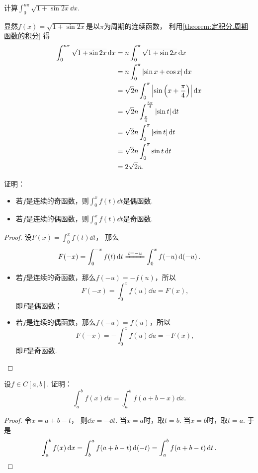 \begin{example}
计算\(\int_0^{n\pi} \sqrt{1 + \sin2x} \dd{x}\).
\begin{solution}
显然\(f(x) = \sqrt{1 + \sin2x}\)是以\(\pi\)为周期的连续函数，
利用\cref{theorem:定积分.周期函数的积分} 得\begin{align*}
	\int_0^{n\pi} \sqrt{1 + \sin2x} \dd{x}
	&= n \int_0^\pi \sqrt{1 + \sin2x} \dd{x} \\
	&= n \int_0^\pi \abs{\sin x + \cos x} \dd{x} \\
	&= \sqrt2 n \int_0^\pi \abs{\sin\left(x + \frac\pi4\right)} \dd{x} \\
	&= \sqrt2 n \int_{\frac\pi4}^{\frac{5\pi}4} \abs{\sin t} \dd{t} \\
	&= \sqrt2 n \int_0^\pi \abs{\sin t} \dd{t} \\
	&= \sqrt2 n \int_0^\pi \sin t \dd{t} \\
	&= 2\sqrt2 n.
\end{align*}
\end{solution}
\end{example}

\begin{proposition}
证明：\begin{itemize}
	\item 若\(f\)是连续的奇函数，则\(\int_0^x f(t) \dd{t}\)是偶函数.
	\item 若\(f\)是连续的偶函数，则\(\int_0^x f(t) \dd{t}\)是奇函数.
\end{itemize}
\begin{proof}
设\(F(x) = \int_0^x f(t) \dd{t}\)，
那么\[
	F(-x) = \int_0^{-x} f(t) \dd{t}
	\xlongequal{t=-u} \int_0^x f(-u) \dd(-u).
\]
\begin{itemize}
	\item 若\(f\)是连续的奇函数，那么\(f(-u) = -f(u)\)，所以\[
		F(-x) = \int_0^x f(u) \dd{u} = F(x),
	\]
	即\(F\)是偶函数；

	\item 若\(f\)是连续的偶函数，那么\(f(-u) = f(u)\)，所以\[
		F(-x) = -\int_0^x f(u) \dd{u} = -F(x),
	\]
	即\(F\)是奇函数.
	\qedhere
\end{itemize}
\end{proof}
\end{proposition}

\begin{proposition}
设\(f \in C[a,b]\).
证明：\begin{equation}
	\int_a^b f(x) \dd{x}
	= \int_a^b f(a+b-x) \dd{x}.
\end{equation}
\begin{proof}
令\(x=a+b-t\)，
则\(\dd{x} = -\dd{t}\).
当\(x=a\)时，取\(t=b\).
当\(x=b\)时，取\(t=a\).
于是\[
	\int_a^b f(x) \dd{x}
	= \int_b^a f(a+b-t) \dd(-t)
	= \int_a^b f(a+b-t) \dd{t}.
	\qedhere
\]
\end{proof}
\end{proposition}

